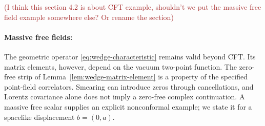 \documentclass[a4paper,11pt]{article}
\theoremstyle{definition}
\newcommand{\KL}[1]{\textcolor{brown}{#1}}
\begin{document}
\KL{(I think this section 4.2 is about CFT example, shouldn't we put the massive free field example somewhere else? Or rename the section)}
\paragraph{Massive free fields:}
The geometric operator \eqref{eq:wedge-characteristic} remains valid beyond CFT. Its matrix elements, however, depend on the vacuum two-point function. The zero-free strip of Lemma~\ref{lem:wedge-matrix-element} is a property of the specified point-field correlators. Smearing can introduce zeros through cancellations, and Lorentz covariance alone does not imply a zero-free complex continuation. A massive free scalar supplies an explicit nonconformal example; we state it for a spacelike displacement $b=(0,a)$.
\end{document}
